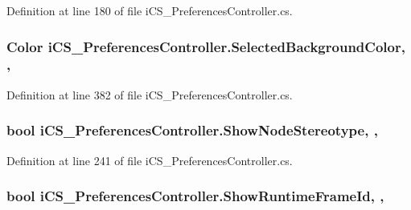 Definition at line 180 of file i\+C\+S\+\_\+\+Preferences\+Controller.\+cs.

\hypertarget{classi_c_s___preferences_controller_ab5a21b42ff7ac5d0772f0ac012547d7e}{
\subsubsection[{Selected\+Background\+Color}]{\setlength{\rightskip}{0pt plus 5cm}Color i\+C\+S\+\_\+\+Preferences\+Controller.\+Selected\+Background\+Color\hspace{0.3cm}{\ttfamily [static]}, {\ttfamily [get]}, {\ttfamily [set]}}}\label{classi_c_s___preferences_controller_ab5a21b42ff7ac5d0772f0ac012547d7e}


Definition at line 382 of file i\+C\+S\+\_\+\+Preferences\+Controller.\+cs.

\hypertarget{classi_c_s___preferences_controller_a90da3413652f4f7a4b11f4365ef3fdd8}{
\subsubsection[{Show\+Node\+Stereotype}]{\setlength{\rightskip}{0pt plus 5cm}bool i\+C\+S\+\_\+\+Preferences\+Controller.\+Show\+Node\+Stereotype\hspace{0.3cm}{\ttfamily [static]}, {\ttfamily [get]}, {\ttfamily [set]}}}\label{classi_c_s___preferences_controller_a90da3413652f4f7a4b11f4365ef3fdd8}


Definition at line 241 of file i\+C\+S\+\_\+\+Preferences\+Controller.\+cs.

\hypertarget{classi_c_s___preferences_controller_a25013372c0780c8825dd8f6fc8cd5586}{
\subsubsection[{Show\+Runtime\+Frame\+Id}]{\setlength{\rightskip}{0pt plus 5cm}bool i\+C\+S\+\_\+\+Preferences\+Controller.\+Show\+Runtime\+Frame\+Id\hspace{0.3cm}{\ttfamily [static]}, {\ttfamily [get]}, {\ttfamily [set]}}}\label{classi_c_s___preferences_controller_a25013372c0780c8825dd8f6fc8cd5586}


